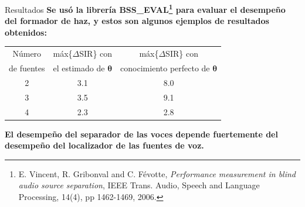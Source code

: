 \documentclass[12pt,aspectratio=169]{beamer}
\begin{document}
	\begin{frame}{Resultados}
		\textbf{Se usó la librería BSS\_EVAL\footnote{E. Vincent, R. Gribonval and C. Févotte, \textit{Performance measurement in blind audio source separation}, IEEE Trans. Audio, Speech and Language Processing, 14(4), pp 1462-1469, 2006.} para evaluar el desempeño del formador de haz, y estos son algunos ejemplos de resultados obtenidos:}
		\begin{table}[H]
			\begin{center}
				\begin{tabular}{|c||c|c|}
					\hline Número & máx\{$\Delta$SIR\} con & máx\{$\Delta$SIR\} con \\ 
					de fuentes & el estimado de $\pmb{\theta}$ & conocimiento perfecto de $\pmb{\theta}$ \\ 
					\hline \hline 
					2 & 3.1 & 8.0  \\
					\hline 									 			
					3 & 3.5 & 9.1 \\
					\hline 									 			
					4 & 2.3 & 2.8  \\
					\hline 							
				\end{tabular}
			\end{center}
		\end{table}
		\vspace{-3mm}
		\pause
		\color{red} \textbf{El desempeño del separador de las voces depende fuertemente del desempeño del localizador de las fuentes de voz.}
	\end{frame}
	
%	
	
\end{document}
